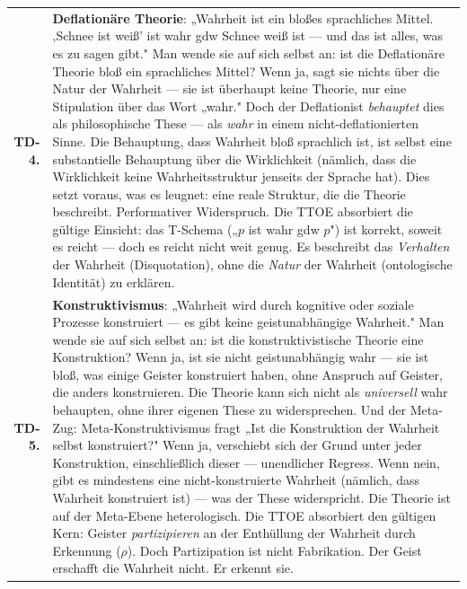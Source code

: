 \documentclass[10pt, openany, oneside]{book}
\renewcommand{\footnotesize}{\fontsize{8.5}{11}\selectfont}
\begin{document}
\vspace{0.5em}

{\footnotesize
\noindent\begin{tabular}{r p{}}
\textbf{TD-4.} & \textbf{Deflationäre Theorie}: „Wahrheit ist ein bloßes sprachliches Mittel. ‚Schnee ist weiß' ist wahr gdw Schnee weiß ist --- und das ist alles, was es zu sagen gibt." Man wende sie auf sich selbst an: ist die Deflationäre Theorie bloß ein sprachliches Mittel? Wenn ja, sagt sie nichts über die Natur der Wahrheit --- sie ist überhaupt keine Theorie, nur eine Stipulation über das Wort „wahr." Doch der Deflationist \textit{behauptet} dies als philosophische These --- als \textit{wahr} in einem nicht-deflationierten Sinne. Die Behauptung, dass Wahrheit bloß sprachlich ist, ist selbst eine substantielle Behauptung über die Wirklichkeit (nämlich, dass die Wirklichkeit keine Wahrheitsstruktur jenseits der Sprache hat). Dies setzt voraus, was es leugnet: eine reale Struktur, die die Theorie beschreibt. Performativer Widerspruch. Die TTOE absorbiert die gültige Einsicht: das T-Schema („$p$ ist wahr gdw $p$") ist korrekt, soweit es reicht --- doch es reicht nicht weit genug. Es beschreibt das \textit{Verhalten} der Wahrheit (Disquotation), ohne die \textit{Natur} der Wahrheit (ontologische Identität) zu erklären. \\[0.5em]
\textbf{TD-5.} & \textbf{Konstruktivismus}: „Wahrheit wird durch kognitive oder soziale Prozesse konstruiert --- es gibt keine geistunabhängige Wahrheit." Man wende sie auf sich selbst an: ist die konstruktivistische Theorie eine Konstruktion? Wenn ja, ist sie nicht geistunabhängig wahr --- sie ist bloß, was einige Geister konstruiert haben, ohne Anspruch auf Geister, die anders konstruieren. Die Theorie kann sich nicht als \textit{universell} wahr behaupten, ohne ihrer eigenen These zu widersprechen. Und der Meta-Zug: Meta-Konstruktivismus fragt „Ist die Konstruktion der Wahrheit selbst konstruiert?" Wenn ja, verschiebt sich der Grund unter jeder Konstruktion, einschließlich dieser --- unendlicher Regress. Wenn nein, gibt es mindestens eine nicht-konstruierte Wahrheit (nämlich, dass Wahrheit konstruiert ist) --- was der These widerspricht. Die Theorie ist auf der Meta-Ebene heterologisch. Die TTOE absorbiert den gültigen Kern: Geister \textit{partizipieren} an der Enthüllung der Wahrheit durch Erkennung ($\rho$). Doch Partizipation ist nicht Fabrikation. Der Geist erschafft die Wahrheit nicht. Er erkennt sie. \\[0.5em]

\end{tabular}}
\end{document}
